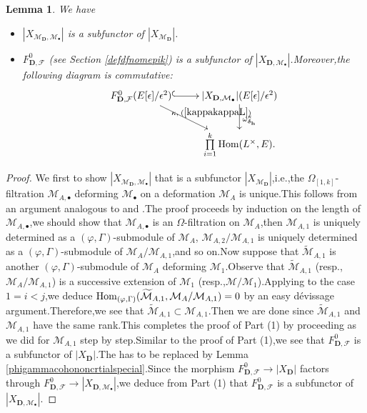 \documentclass[SecEq,CM,GP]{degruyter-crelle} %
\theoremstyle{plain}
\newtheorem{lem}[thm]{Lemma}
\newcommand{\Dpik}{{\mathbf{D}}}
\newcommand{\homo}{{\rm Hom}}
\newcommand{\omepik}{\Omega_{[1,k]}}
\newcommand{\bh}{{\mathbf{h}}}
\newcommand{\cM}{\mathcal M}
\newcommand{\cF}{\mathcal F}
\begin{document}
\begin{lem}We have
\begin{itemize}
	\item[(1)]	$|X_{\cM_\Dpik,\cM_{\bullet}}|$ is a subfunctor of $|X_{\cM_\Dpik}|$.\;
	\item[(2)]  $F_{\Dpik,\cF}^0$ (see Section \ref{defdfnomepik}) is a subfunctor of $|X_{\Dpik,\cM_{\bullet}}|$.\;Moreover,\;the following  diagram is commutative:
	\begin{equation}\label{LINVcompatiblemap1}
		\xymatrix{ F_{\Dpik,\cF}^0(E[\epsilon]/\epsilon^2) \ar[dr]^{\kappa,\;(\ref{kappakappaL})}  \ar@{^(->}[r] &  |X_{\Dpik,\cM_{\bullet}}|(E[\epsilon]/\epsilon^2) \ar[d]^{\omega^{\kappa}_{\bm{\delta}_{\bh}}}  \\
			& \prod\limits_{i=1}^k\homo(L^\times,E).}
	\end{equation}
\end{itemize}
\end{lem}
\begin{proof}We first to show $|X_{\cM_\Dpik,\cM_{\bullet}}|$ that is a subfunctor  $|X_{\cM_\Dpik}|$,\;i.e.,\;the $\omepik$-filtration  $\cM_{A,\bullet}$ deforming $\cM_{\bullet}$ on a deformation $\cM_A$ is unique.\;This follows from an argument analogous to   \cite[Proposition 6.2.8]{Ding2021} and \cite[Proposition 2.3.6]{AST2009324R10}.\;The proof proceeds by induction on the length of $\cM_{A,\bullet}$,\;we should show that $\cM_{A,\bullet}$ is an $\Omega$-filtration on $\cM_A$,\;then $\cM_{A,1}$ is uniquely determined as a $(\varphi,\Gamma)$-submodule of $\cM_{A}$,
${\cM}_{A,2}/{\cM}_{A,1}$ is uniquely determined as a $(\varphi,\Gamma)$-submodule of $\cM_{A}/{\cM}_{A,1}$,\;and so on.\;Now suppose that $\widetilde{\cM}_{A,1}$ is another $(\varphi,\Gamma)$-submodule of $\cM_{A}$ deforming $\cM_{1}$.\;Observe that $\widetilde{\cM}_{A,1}$ (resp.,\;$\cM_A/\cM_{A,1}$) is a successive extension of $\cM_{1}$ (resp.,\;$\cM/\cM_{1}$).\;Applying \cite[Lemma 6.2.5 (1)]{Ding2021} to the case $1=i<j$,\;we deduce  $\homo_{(\varphi,\Gamma)}(\widetilde{\cM}_{A,1},\cM_A/\cM_{A,1})=0$ by an easy d\'{e}vissage argument.\;Therefore,\;we see that $\widetilde{\cM}_{A,1}\subset \cM_{A,1}$.\;Then we are done since $\widetilde{\cM}_{A,1}$ and $\cM_{A,1}$ have the same rank.\;This completes the proof of Part (1) by proceeding as we did for $\cM_{A,1}$ step by step.\;Similar to the proof of Part (1),\;we see that $F_{\Dpik,\cF}^0$ is a subfunctor of $|X_{\Dpik}|$.\;The \cite[Lemma 6.2.5 (1)]{Ding2021} has to be replaced by Lemma \ref{phigammacohononcrtialspecial}.\;Since the morphism $F_{\Dpik,\cF}^0\rightarrow |X_{\Dpik}|$ factors through $F_{\Dpik,\cF}^0\rightarrow |X_{\Dpik,\cM_{\bullet}}|$,\;we deduce from Part (1) that $F_{\Dpik,\cF}^0$ is a subfunctor of $|X_{\Dpik,\cM_{\bullet}}|$.\;
\end{proof}
\end{document}
